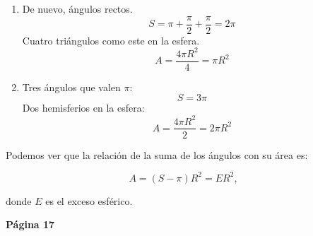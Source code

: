 \begin{enumerate}
\begin{enumerate}
	\item De nuevo, ángulos rectos.
	\[S = \pi+\frac{\pi}{2}+\frac{\pi}{2}=2\pi\]
	Cuatro triángulos como este en la esfera.
	\[A = \frac{4\pi R^2}{4} = \pi R^2\]
		
	\item Tres ángulos que valen $\pi$:
	\[S=3\pi\]
	Dos hemisferios en la esfera:
	\[A=\frac{4\pi R^2}{2} = 2\pi R^2\]

	\end{enumerate}
	
Podemos ver que la relación de la suma de los ángulos con su área es:

\[A = (S-\pi)R^2 = E R^2,\]

donde $E$ es el exceso esférico.



\end{enumerate}

\vspace{0.5cm}

\textbf{Página 17}

